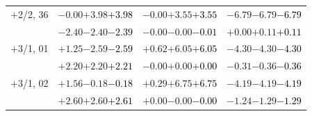 \documentclass[compress]{beamer}
\begin{document}
\begin{frame}
\begin{tabular}{r | c | c | c}
$+$2/2, 36 & $-0.00$\hspace{0.1 cm}$+3.98$\hspace{0.1 cm}\textcolor{black}{$+3.98$} & $-0.00$\hspace{0.1 cm}$+3.55$\hspace{0.1 cm}\textcolor{black}{$+3.55$} & $-6.79$\hspace{0.1 cm}$-6.79$\hspace{0.1 cm}\textcolor{black}{$-6.79$} \\
           & $-2.40$\hspace{0.1 cm}$-2.40$\hspace{0.1 cm}\textcolor{black}{$-2.39$} & $-0.00$\hspace{0.1 cm}$-0.00$\hspace{0.1 cm}\textcolor{black}{$-0.01$} & $+0.00$\hspace{0.1 cm}$+0.11$\hspace{0.1 cm}\textcolor{black}{$+0.11$} \\
$+$3/1, 01 & $+1.25$\hspace{0.1 cm}$-2.59$\hspace{0.1 cm}\textcolor{black}{$-2.59$} & $+0.62$\hspace{0.1 cm}$+6.05$\hspace{0.1 cm}\textcolor{black}{$+6.05$} & $-4.30$\hspace{0.1 cm}$-4.30$\hspace{0.1 cm}\textcolor{black}{$-4.30$} \\
           & $+2.20$\hspace{0.1 cm}$+2.20$\hspace{0.1 cm}\textcolor{black}{$+2.21$} & $-0.00$\hspace{0.1 cm}$+0.00$\hspace{0.1 cm}\textcolor{black}{$+0.00$} & $-0.31$\hspace{0.1 cm}$-0.36$\hspace{0.1 cm}\textcolor{black}{$-0.36$} \\
$+$3/1, 02 & $+1.56$\hspace{0.1 cm}$-0.18$\hspace{0.1 cm}\textcolor{black}{$-0.18$} & $+0.29$\hspace{0.1 cm}$+6.75$\hspace{0.1 cm}\textcolor{black}{$+6.75$} & $-4.19$\hspace{0.1 cm}$-4.19$\hspace{0.1 cm}\textcolor{black}{$-4.19$} \\
           & $+2.60$\hspace{0.1 cm}$+2.60$\hspace{0.1 cm}\textcolor{black}{$+2.61$} & $+0.00$\hspace{0.1 cm}$-0.00$\hspace{0.1 cm}\textcolor{black}{$-0.00$} & $-1.24$\hspace{0.1 cm}$-1.29$\hspace{0.1 cm}\textcolor{black}{$-1.29$} \\

\end{tabular}
\end{frame}
\end{document}
